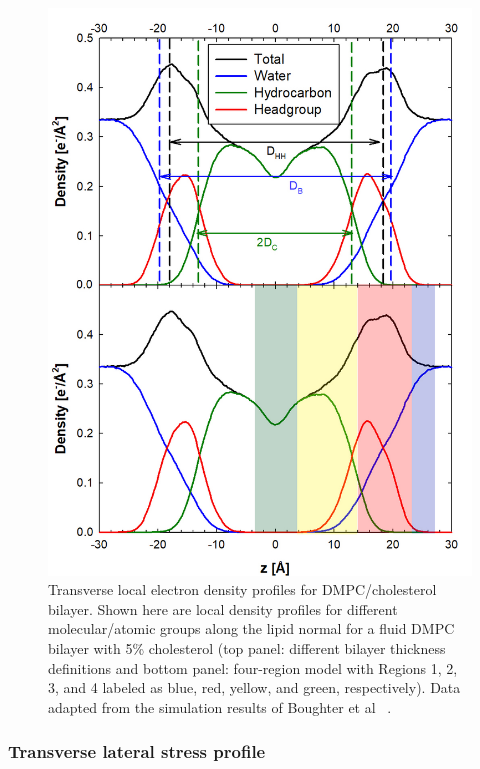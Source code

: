\documentclass[9pt,bestpractices,pubversion]{livecoms}
\begin{document}
\begin{figure}[h]
\centering
\begin{minipage}[c]{\columnwidth}
\centering
	\includegraphics[width=\columnwidth]{figures/densityprofile.jpg}
	\caption{Transverse local electron density profiles for DMPC/cholesterol bilayer. Shown here are local density profiles for different molecular/atomic groups along the lipid normal for a fluid DMPC bilayer with 5\% cholesterol (top panel: different bilayer thickness definitions and bottom panel: four-region model with Regions 1, 2, 3, and 4 labeled as blue, red, yellow, and green, respectively). Data adapted from the simulation results of Boughter et al ~\cite{Boughter2016}.}
	\label{fig:density}
\end{minipage}
\end{figure}

\subsubsection{Transverse lateral stress profile}
\label{subsubsec:latstress}
\end{document}
